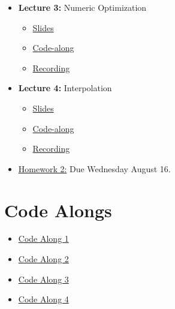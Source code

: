 \documentclass[
]{book}
\providecommand{\tightlist}{%
  \setlength{\itemsep}{0pt}\setlength{\parskip}{0pt}}
\begin{document}
\begin{itemize}
\tightlist
\item
  \textbf{Lecture 3:} Numeric Optimization

  \begin{itemize}
  \tightlist
  \item
    \href{https://kevinghunt.github.io/ComputationCamp/lectures/Lecture3.html}{Slides}
  \item
    \href{https://kevinghunt.github.io/ComputationCamp/codealongs/CodeAlong3.jl}{Code-along}
  \item
    \href{https://uwmadison.zoom.us/rec/share/xD1LsrLsUF8XtJUjPTVDA_2d52EKgQTF1a6Dc3lBOSB7JlRk4PMUi_h0oMRnMtb5.VW6mJ7BkoiC6riUk}{Recording}
  \end{itemize}
\item
  \textbf{Lecture 4:} Interpolation

  \begin{itemize}
  \tightlist
  \item
    \href{https://kevinghunt.github.io/ComputationCamp/lectures/Lecture4.html}{Slides}
  \item
    \href{https://kevinghunt.github.io/ComputationCamp/codealongs/CodeAlong4.jl}{Code-along}
  \item
    \href{https://uwmadison.zoom.us/rec/share/YNnLYBVpnTSQsMTHQGDDWx2n89gURdYXzVWM8dRyV4o91bAfmCkC8q1IT3f-jo3B.msXmwKB-ZcXcIZRL}{Recording}
  \end{itemize}
\item
  \href{https://kevinghunt.github.io/ComputationCamp/homeworks/homework2.html}{Homework 2:} Due Wednesday August 16.
\end{itemize}

\hypertarget{code-alongs}{%
\chapter{Code Alongs}\label{code-alongs}}

\begin{itemize}
\tightlist
\item
  \href{https://kevinghunt.github.io/ComputationCamp/codealongs/CodeAlong1.jl}{Code Along 1}
\item
  \href{https://kevinghunt.github.io/ComputationCamp/codealongs/CodeAlong2.jl}{Code Along 2}
\item
  \href{https://kevinghunt.github.io/ComputationCamp/codealongs/CodeAlong3.jl}{Code Along 3}
\item
  \href{https://kevinghunt.github.io/ComputationCamp/codealongs/CodeAlong4.jl}{Code Along 4}
\end{itemize}

  
\end{document}
